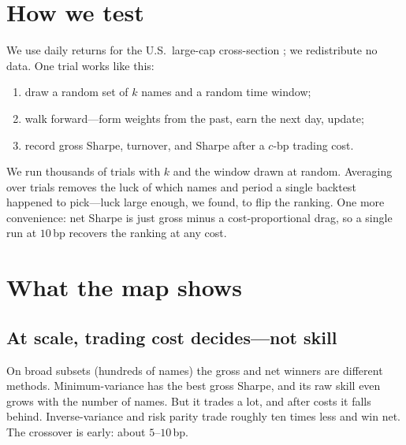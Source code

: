 \documentclass[11pt]{article}
\begin{document}
\section{How we test}
We use daily returns for the U.S.\ large-cap cross-section
\parencite{winningport}; we redistribute no data. One trial works like
this:
\begin{enumerate}
  \item draw a random set of $k$ names and a random time window;
  \item walk forward---form weights from the past, earn the next day, update;
  \item record gross Sharpe, turnover, and Sharpe after a $c$-bp trading cost.
\end{enumerate}
We run thousands of trials with $k$ and the window drawn at random. Averaging over
trials removes the luck of which names and period a single backtest
happened to pick---luck large enough, we found, to flip the ranking. One more
convenience: net Sharpe is just gross minus a cost-proportional drag, so a single
run at $10$\,bp recovers the ranking at any cost.

\section{What the map shows}

\subsection{At scale, trading cost decides---not skill}
On broad subsets (hundreds of names) the gross and net winners are different
methods. Minimum-variance has the best gross Sharpe, and its raw skill even
grows with the number of names. But it trades a lot, and after costs it
falls behind. Inverse-variance and risk parity trade roughly ten times less and
win net. The crossover is early: about $5$--$10$\,bp.
\end{document}
